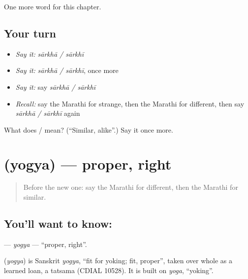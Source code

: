 \begin{grammarlens}[title={What you've built}]
One more word for this chapter.
\end{grammarlens}

\subsection*{Your turn}
\begin{itemize}
\raggedright
  \item \emph{Say it:} \emph{sārkhā / sārkhī}
  \item \emph{Say it:} \emph{sārkhā / sārkhī}, once more
  \item \emph{Say it:} say \emph{sārkhā / sārkhī}
  \item \emph{Recall:} say the Marathi for strange, then the Marathi for different, then say \emph{sārkhā / sārkhī} again
\end{itemize}

\begin{tcolorbox}[breakable,colback=teal!4,colframe=teal!35!black,title={Before you move on}]
What does  /  mean? (\textquotedblleft{}Similar, alike\textquotedblright{}.) Say it once more.
\end{tcolorbox}
\section[\texorpdfstring{\mr{योग्य} (yogya)}{योग्य (yogya)}]{ (yogya) — proper, right}

\label{lesson:MR-C175-yogya}



\begin{quote}
Before the new one: say the Marathi for different, then the Marathi for similar.
\end{quote}

\subsection*{You'll want to know: }
\textbf{} — \emph{yogya} — \textquotedblleft{}proper, right\textquotedblright{}.

\begin{cousinweb}
\textbf{} (\emph{yogya}) is Sanskrit \emph{yogya}, \textquotedblleft{}fit for yoking; fit, proper\textquotedblright{}, taken over whole as a learned loan, a tatsama (CDIAL 10528). It is built on \emph{yoga}, \textquotedblleft{}yoking\textquotedblright{}.
\end{cousinweb}

